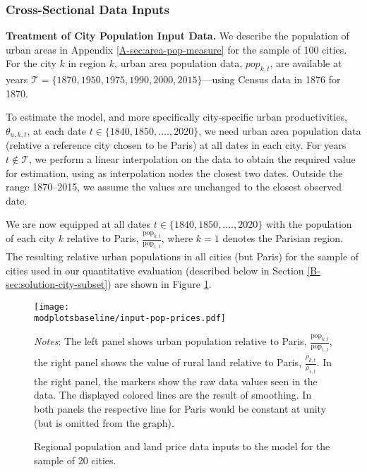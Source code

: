 \documentclass[11pt]{report}
\newcommand{\round}{revision3}  %
\newcommand{\modplotsbaseline}{../../output/model/plots/\round/baseline}
\begin{document}
\subsubsection{Cross-Sectional Data Inputs}\label{B-sec:input-cross}

\textbf{Treatment of City Population Input Data.} We describe the population of urban areas in Appendix \ref{A-sec:area-pop-measure} for the sample of 100 cities. For the city $k$ in region $k$, urban area population data, $pop_{k,t}$, are available at years $\mathcal{T}=\{ 1870, 1950, 1975, 1990, 2000, 2015\}$---using Census data in 1876 for 1870.

To estimate the model, and more specifically city-specific urban productivities, $\theta_{u,k,t}$, at each date $t \in \{1840, 1850, ....,2020\}$, we need urban area population data (relative a reference city chosen to be Paris) at all dates in each city. For years $t \notin \mathcal{T}$, we perform a linear interpolation on the data to obtain the required value for estimation, using as interpolation nodes the closest two dates. Outside the range 1870--2015, we assume the values are unchanged to the closest observed date.

We are now equipped at all dates $t \in \{1840, 1850, ...., 2020\}$ with the population of each city $k$ relative to Paris, $\frac{\text{pop}_{k,t}}{\text{pop}_{1,t}}$, where $k=1$ denotes the Parisian region. The resulting relative urban populations in all cities (but Paris) for the sample of cities used in our quantitative evaluation (described below in Section \ref{B-sec:solution-city-subset}) are shown in Figure \ref{B-fig:pop-price-inputs}.

\begin{figure}[h]
\begin{center} 
    \texttt{[image: \\modplotsbaseline/input-pop-prices.pdf]}
	\caption{Regional population and land price data inputs to the model for the sample of 20 cities.\label{B-fig:pop-price-inputs}}
\end{center}
	 {\footnotesize \textit{Notes}: The left panel shows urban population relative to Paris, $\frac{\text{pop}_{k,t}}{\text{pop}_{1,t}}$, the right panel shows the value of rural land relative to Paris, $\frac{\bar{\rho}_{k,t}}{\bar{\rho}_{1,t}}$. In the right panel, the markers show the raw data values seen in the data. The displayed colored lines are the result of smoothing. In both panels the respective line for Paris would be constant at unity (but is omitted from the graph).}
\end{figure}
\end{document}

